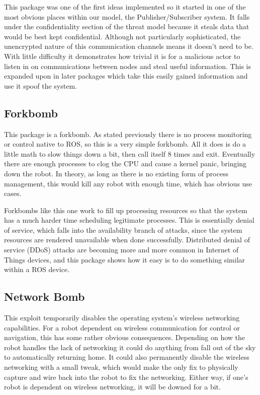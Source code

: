 \documentclass[IEEEtran,letterpaper,10pt,notitlepage,draftclsnofoot]{article}
\begin{document}
This package was one of the first ideas implemented so it started in one of the most obvious places within our model, the Publisher/Subscriber system.
It falls under the confidentiality section of the threat model because it steals data that would be best kept confidential. 
Although not particularly sophisticated, the unencrypted nature of this communication channels means it doesn't need to be. 
With little difficulty it demonstrates how trivial it is for a malicious actor to listen in on communications between nodes and steal useful information.
This is expanded upon in later packages which take this easily gained information and use it spoof the system.

\subsection{Forkbomb}
This package is a forkbomb.
As stated previously there is no process monitoring or control native to ROS, so this is a very simple forkbomb. All it does is 
do a little math to slow things down a bit, then call itself 8 times and exit.
Eventually there are enough processes to clog the CPU and cause a kernel panic, bringing down the robot.
In theory, as long as there is no existing form of process management, this would kill any robot with enough time, which has 
obvious use cases.

Forkbombs like this one work to fill up processing resources so that the system has a much harder time scheduling legitimate processes. 
This is essentially denial of service, which falls into the availability branch of attacks, since the system resources are rendered unavailable when done successfully.
Distributed denial of service (DDoS) attacks are becoming more and more common in Internet of Things devices, and this package shows how it easy is to do something similar within a ROS device.

\subsection{Network Bomb}
This exploit temporarily disables the operating system's wireless networking capabilities.
For a robot dependent on wireless communication for control or navigation, this has some rather obvious consequences.
Depending on how the robot handles the lack of networking it could do anything from fall out of the sky to automatically
returning home. It could also permanently disable the wireless networking with a small tweak, which would make the only 
fix to physically capture and wire back into the robot to fix the networking. 
Either way, if one's robot is dependent on wireless networking, it will be downed for a bit.
\end{document}

